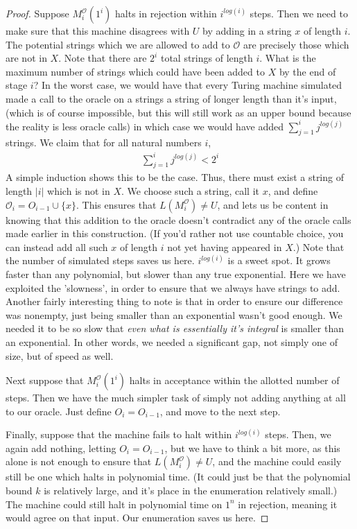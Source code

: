 \begin{proof}
    \par Suppose $M_i^{\mathcal{O}}(1^i)$ halts in rejection within $i^{log(i)}$ steps. Then we need to make sure that this machine disagrees with $U$ by adding in a string $x$ of length $i$. The potential strings which we are allowed to add to $\mathcal{O}$ are precisely those which are not in $X$. Note that there are $2^i$ total strings of length $i$. What is the maximum number of strings which could have been added to $X$ by the end of stage $i$? In the worst case, we would have that every Turing machine simulated made a call to the oracle on a strings a string of longer length than it's input, (which is of course impossible, but this will still work as an upper bound because the reality is less oracle calls) in which case we would have added $\sum_{j=1}^{i}j^{log(j)}$ strings. We claim that for all natural numbers $i$,
    \begin{align}
        \sum_{j=1}^{i}j^{log(j)} < 2^i
    \end{align}
    A simple induction shows this to be the case. Thus, there must exist a string of length $|i|$ which is not in $X$. We choose such a string, call it $x$, and define $\mathcal{O}_i = O_{i-1} \cup \{x\}$. This ensures that $L(M_i^{\mathcal{O}}) \neq U$, and lets us be content in knowing that this addition to the oracle doesn't contradict any of the oracle calls made earlier in this construction. (If you'd rather not use countable choice, you can instead add all such $x$ of length $i$ not yet having appeared in $X$.) Note that the number of simulated steps saves us here. $i^{log(i)}$ is a sweet spot. It grows faster than any polynomial, but slower than any true exponential. Here we have exploited the 'slowness', in order to ensure that we always have strings to add. Another fairly interesting thing to note is that in order to ensure our difference was nonempty, just being smaller than an exponential wasn't good enough. We needed it to be so slow that \textit{even what is essentially it's integral} is smaller than an exponential. In other words, we needed a significant gap, not simply one of size, but of speed as well.
    \par Next suppose that $M_i^{\mathcal{O}}(1^i)$ halts in acceptance within the allotted number of steps. Then we have the much simpler task of simply not adding anything at all to our oracle. Just define $O_i = O_{i-1}$, and move to the next step.
    \par Finally, suppose that the machine fails to halt within $i^{log(i)}$ steps. Then, we again add nothing, letting $O_i = O_{i-1}$, but we have to think a bit more, as this alone is not enough to ensure that $L(M_i^{\mathcal{O}}) \neq U$, and the machine could easily still be one which halts in polynomial time. (It could just be that the polynomial bound $k$ is relatively large, and it's place in the enumeration relatively small.) The machine could still halt in polynomial time on $1^n$ in rejection, meaning it would agree on that input. Our enumeration saves us here. 

\end{proof}
